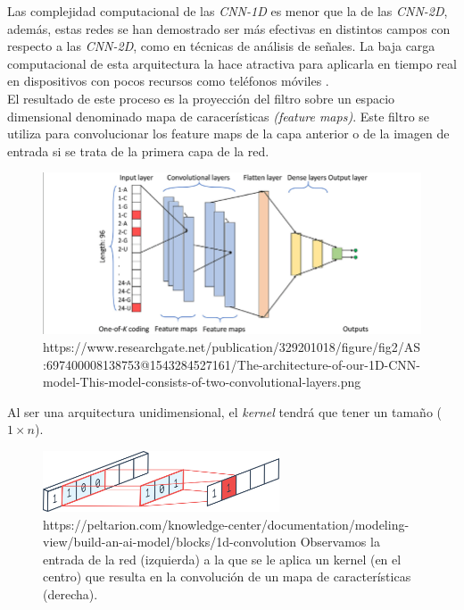                     Las complejidad computacional de las \textit{CNN-1D} es menor que la de las \textit{CNN-2D}, además, estas redes se han demostrado ser más efectivas en distintos campos con respecto a las \textit{CNN-2D}, como en técnicas de análisis de señales. La baja carga computacional de esta arquitectura la hace atractiva para aplicarla en tiempo real en dispositivos con pocos recursos como teléfonos móviles \cite{Conv1D_Survey}.\\


                    El resultado de este proceso es la proyección del filtro sobre un espacio dimensional denominado mapa de caracerísticas \textit{(feature maps)}. Este filtro se utiliza para convolucionar los feature maps de la capa anterior \cite{FiltersFeatureMaps} o de la imagen de entrada si se trata de la primera capa de la red.
                    

                    \begin{figure}[h]
                        \centering
                        \includegraphics[width=15cm]{archivos/3.Tecnologias/RedesNeuronales/CNN/1D/1CNNArchImage}
                        \caption{https://www.researchgate.net/publication/329201018/figure/fig2/AS:697400008138753@1543284527161/The-architecture-of-our-1D-CNN-model-This-model-consists-of-two-convolutional-layers.png}
                        \label{1CNNArchImage}
                    \end{figure}


                    Al ser una arquitectura unidimensional, el \textit{kernel} tendrá que tener un tamaño ($1 \times n$).

                    \begin{figure}[h]
                        \centering
                        \includegraphics[width=7cm]{archivos/3.Tecnologias/RedesNeuronales/CNN/1D/1DConvolution}
                        \caption{https://peltarion.com/knowledge-center/documentation/modeling-view/build-an-ai-model/blocks/1d-convolution Observamos la entrada de la red (izquierda) a la que se le aplica un kernel (en el centro) que resulta en la convolución de un mapa de características (derecha).}
                        \label{1DConvolutionImage}
                    \end{figure}

